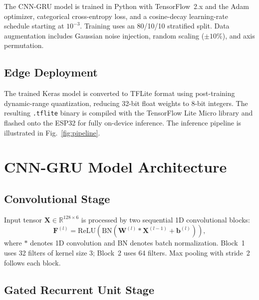 \documentclass[conference]{IEEEtran}
\begin{document}
The CNN-GRU model is trained in Python with TensorFlow~2.x and the Adam
optimizer, categorical cross-entropy loss, and a cosine-decay
learning-rate schedule starting at $10^{-3}$. Training uses an 80/10/10
stratified split. Data augmentation includes Gaussian noise injection,
random scaling ($\pm10\%$), and axis permutation.

\subsection{Edge Deployment}

The trained Keras model is converted to TFLite format using post-training
dynamic-range quantization, reducing 32-bit float weights to 8-bit
integers. The resulting \texttt{.tflite} binary is compiled with the
TensorFlow Lite Micro library and flashed onto the ESP32 for fully
on-device inference. The inference pipeline is illustrated in
Fig.~\ref{fig:pipeline}.

\section{CNN-GRU Model Architecture}
\label{sec:model}

\subsection{Convolutional Stage}

Input tensor $\mathbf{X} \in \mathbb{R}^{128 \times 6}$ is processed by
two sequential 1D convolutional blocks:
\begin{equation}
  \mathbf{F}^{(l)} = \mathrm{ReLU}\!\left(\mathrm{BN}\!\left(
    \mathbf{W}^{(l)} * \mathbf{X}^{(l-1)} + \mathbf{b}^{(l)}\right)\right),
  \label{eq:conv}
\end{equation}
where $*$ denotes 1D convolution and BN denotes batch normalization.
Block~1 uses 32 filters of kernel size 3; Block~2 uses 64 filters. Max
pooling with stride~2 follows each block.

\subsection{Gated Recurrent Unit Stage}
\end{document}
